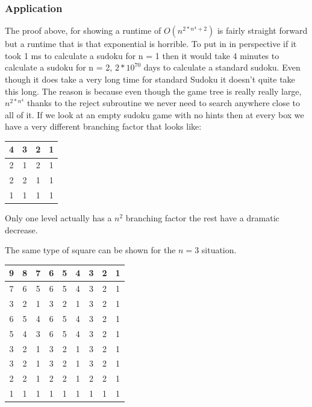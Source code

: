 \documentclass{sig-alternate}
\begin{document}
\subsubsection{Application}
The proof above, for showing a runtime of $O(n^{2*n^4 + 2})$ is fairly straight forward but a runtime that is that exponential is horrible. To put in in perspective if it took 1 ms to calculate a sudoku for n = 1 then it would take 4 minutes to calculate a sudoku for n = 2, $2*10^70$ days to calculate a standard sudoku. Even though it does take a very long time for standard Sudoku it doesn't quite take this long. The reason is because even though the game tree is really really large, $n^{2*n^4}$ thanks to the reject subroutine we never need to search anywhere close to all of it. If we look at an empty sudoku game with no hints then at every box we have a very different branching factor that looks like:

\begin{center}
  \begin{tabular}{ | c | c | c | c | }
    \hline
    	4 & 3 & 2 & 1 \\ \hline
    	2 & 1 & 2 & 1 \\ \hline
    	2 & 2 & 1 & 1 \\ \hline
       	1 & 1 & 1 & 1 \\
    \hline
  \end{tabular}
\end{center}

Only one level actually has a $n^2$ branching factor the rest have a dramatic decrease. 

The same type of square can be shown for the $n = 3$ situation. 

\begin{center}
  \begin{tabular}{ | c | c | c | c | c | c | c | c | c |}
    \hline
    	9 & 8 & 7 & 6 & 5 & 4 & 3 & 2 & 1 \\ \hline
        7 & 6 & 5 & 6 & 5 & 4 & 3 & 2 & 1 \\ \hline
        3 & 2 & 1 & 3 & 2 & 1 & 3 & 2 & 1 \\ \hline
        6 & 5 & 4 & 6 & 5 & 4 & 3 & 2 & 1 \\ \hline
        5 & 4 & 3 & 6 & 5 & 4 & 3 & 2 & 1 \\ \hline
        3 & 2 & 1 & 3 & 2 & 1 & 3 & 2 & 1 \\ \hline
        3 & 2 & 1 & 3 & 2 & 1 & 3 & 2 & 1 \\ \hline
        2 & 2 & 1 & 2 & 2 & 1 & 2 & 2 & 1 \\ \hline
        1 & 1 & 1 & 1 & 1 & 1 & 1 & 1 & 1 \\ 
    \hline
  \end{tabular}
\end{center}
\end{document}
